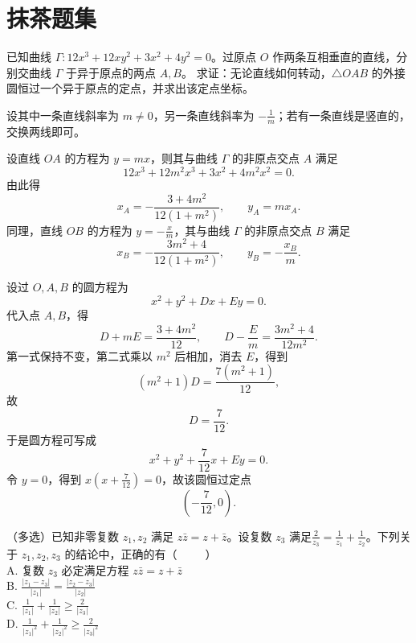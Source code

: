 

\chapter{抹茶题集}
\begin{example}[新曲线]
已知曲线 $\Gamma: 12x^3 + 12xy^2 + 3x^2 + 4y^2 = 0$。过原点 $O$ 作两条互相垂直的直线，分别交曲线 $\Gamma$ 于异于原点的两点 $A, B$。
求证：无论直线如何转动，$\triangle OAB$ 的外接圆恒过一个异于原点的定点，并求出该定点坐标。
\end{example}
\begin{solution}
设其中一条直线斜率为 $m\neq 0$，另一条直线斜率为 $-\frac{1}{m}$；若有一条直线是竖直的，交换两线即可。

设直线 $OA$ 的方程为 $y=mx$，则其与曲线 $\Gamma$ 的非原点交点 $A$ 满足
\[
12x^3+12m^2x^3+3x^2+4m^2x^2=0.
\]
由此得
\[
x_A=-\frac{3+4m^2}{12(1+m^2)},\qquad y_A=mx_A.
\]
同理，直线 $OB$ 的方程为 $y=-\frac{x}{m}$，其与曲线 $\Gamma$ 的非原点交点 $B$ 满足
\[
x_B=-\frac{3m^2+4}{12(1+m^2)},\qquad y_B=-\frac{x_B}{m}.
\]

设过 $O,A,B$ 的圆方程为
\[
x^2+y^2+Dx+Ey=0.
\]
代入点 $A,B$，得
\[
D+ mE=\frac{3+4m^2}{12},\qquad D-\frac{E}{m}=\frac{3m^2+4}{12m^2}.
\]
第一式保持不变，第二式乘以 $m^2$ 后相加，消去 $E$，得到
\[
(m^2+1)D=\frac{7(m^2+1)}{12},
\]
故
\[
D=\frac{7}{12}.
\]
于是圆方程可写成
\[
x^2+y^2+\frac{7}{12}x+Ey=0.
\]
令 $y=0$，得到 $x\left(x+\frac{7}{12}\right)=0$，故该圆恒过定点
\[
\left(-\frac{7}{12},0\right).
\]
\end{solution}
\begin{example}
（多选）已知非零复数 $z_1, z_2$ 满足 $z\bar{z} = z + \bar{z}$。设复数 $z_3$ 满足$\frac{2}{z_3} = \frac{1}{z_1} + \frac{1}{z_2}$。下列关于 $z_1, z_2, z_3$ 的结论中，正确的有（~~~~~）\\
A. 复数 $z_3$ 必定满足方程 $z\bar{z} = z + \bar{z}$\\B. $\frac{|z_1 - z_3|}{|z_1|} = \frac{|z_2 - z_3|}{|z_2|}$\\C. $\frac{1}{|z_1|} + \frac{1}{|z_2|} \ge \frac{2}{|z_3|}$\\D. $\frac{1}{|z_1|^2} + \frac{1}{|z_2|^2} \ge \frac{2}{|z_3|^2}$
\end{example}
